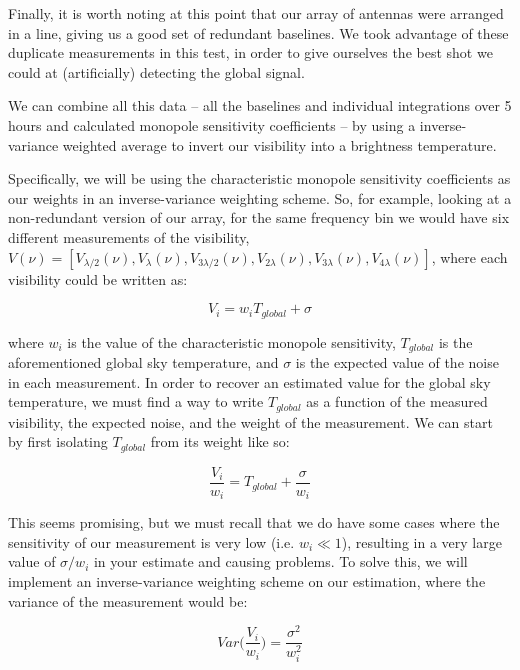 Finally, it is worth noting at this point that our array of antennas were 
arranged in a line, giving us a good set of redundant baselines. We took 
advantage of these duplicate measurements in this test, in order to give 
ourselves the best shot we could at (artificially) detecting the global signal.

We can combine all this data -- all the baselines and individual integrations 
over 5 hours and calculated monopole sensitivity coefficients -- by using a 
inverse-variance weighted average to invert our visibility into a brightness 
temperature.

Specifically, we will be using the characteristic monopole sensitivity 
coefficients as our weights in an inverse-variance weighting scheme. So, for 
example, looking at a non-redundant version of our array, for the same 
frequency bin we would have six different measurements of the visibility, 
$V(\nu) = [V_{\lambda/2}(\nu), V_{\lambda}(\nu), V_{3\lambda/2}(\nu), 
V_{2\lambda}(\nu), V_{3\lambda}(\nu), V_{4\lambda}(\nu)]$, where each 
visibility could be written as:

\begin{equation}
    V_i = w_i T_{global} + \sigma
    \label{eq:vis-weight}
\end{equation}

\noindent where $w_i$ is the value of the characteristic monopole sensitivity, 
$T_{global}$ is the aforementioned global sky temperature, and $\sigma$ is the 
expected value of the noise in each measurement. In order to recover an 
estimated value for the global sky temperature, we must find a way to write 
$T_{global}$ as a function of the measured visibility, the expected noise, and 
the weight of the measurement.  We can start by first isolating $T_{global}$ 
from its weight like so:

\begin{equation}
    \frac{V_i}{w_i} = T_{global} + \frac{\sigma}{w_i}
    \label{eq:isolated-temp}
\end{equation}

This seems promising, but we must recall that we do have some cases where the 
sensitivity of our measurement is very low (i.e. $w_i \ll 1$), resulting in a 
very large value of $\sigma/w_i$ in your estimate and causing problems. To 
solve this, we will implement an inverse-variance weighting scheme on our 
estimation, where the variance of the measurement would be:

\begin{equation}
    Var\Big(\frac{V_i}{w_i}\Big) = \frac{\sigma^2}{w_i^2}
    \label{eq:variance}
\end{equation}

